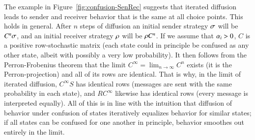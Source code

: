 The example in Figure~\ref{fig:confusion-SenRec} suggests that
iterated diffusion leads to sender and receiver behavior that is the
same at all choice points. This holds in general. After $n$ steps of
diffusion an initial sender strategy $\sigma$ will be $C^n \sigma$,
and an initial receiver strategy $\rho$ will be $\rho C^n$. If
we assume that $\alpha_i > 0$, $C$ is a positive row-stochastic
matrix (each state could in principle be confused as any other state,
albeit with possibly a very low probability). It then follows from the
Perron-Frobenius theorem that the limit $C^\infty = \lim_{n
  \rightarrow \infty} C^n$ exists (it is the Perron-projection) and
all of its rows are identical. That is why, in the limit of iterated
diffusion, $C^\infty S$ has identical rows (messages are sent with the
same probability in each state), and $R C^\infty$ likewise has
identical rows (every message is interpreted equally). All of this is
in line with the intuition that diffusion of behavior under confusion
of states iteratively equalizes behavior for similar states; if all
states can be confused for one another in principle, behavior smoothes
out entirely in the limit.

